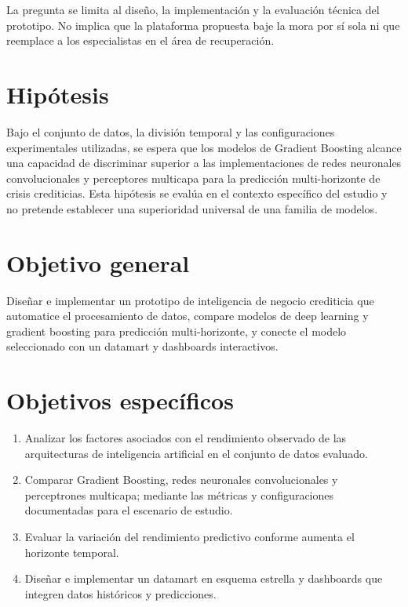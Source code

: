 La pregunta se limita al diseño, la implementación y la evaluación técnica del prototipo. No implica que la plataforma propuesta baje la mora por sí sola ni que reemplace a los especialistas en el área de recuperación.

\section{Hipótesis}

Bajo el conjunto de datos, la división temporal y las configuraciones experimentales utilizadas, se espera que los modelos de Gradient Boosting alcance una capacidad de discriminar superior a las implementaciones de redes neuronales convolucionales y perceptores multicapa para la predicción multi-horizonte de crisis crediticias. Esta hipótesis se evalúa en el contexto específico del estudio y no pretende establecer una superioridad universal de una familia de modelos.

\section{Objetivo general}

Diseñar e implementar un prototipo de inteligencia de negocio crediticia que automatice el procesamiento de datos, compare modelos de deep learning y gradient boosting para predicción multi-horizonte, y conecte el modelo seleccionado con un datamart y dashboards interactivos.

\section{Objetivos específicos}

\begin{enumerate}
    \item Analizar los factores asociados con el rendimiento observado de las arquitecturas de inteligencia artificial en el conjunto de datos evaluado.
    \item Comparar Gradient Boosting, redes neuronales convolucionales y perceptrones multicapa; mediante las métricas y configuraciones documentadas para el escenario de estudio.
    \item Evaluar la variación del rendimiento predictivo conforme aumenta el horizonte temporal.
    \item Diseñar e implementar un datamart en esquema estrella y dashboards que integren datos históricos y predicciones.
\end{enumerate}

